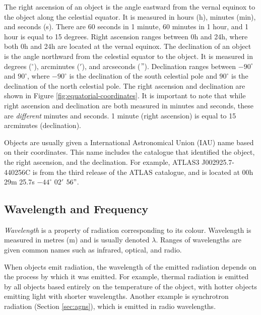             The right ascension of an object is the angle eastward from the
            vernal equinox to the object along the celestial equator. It is
            measured in hours (h), minutes (min), and seconds (s). There are 60
            seconds in 1 minute, 60 minutes in 1 hour, and 1 hour is equal to 15
            degrees. Right ascension ranges between 0h and 24h, where both 0h
            and 24h are located at the vernal equinox. The declination of an
            object is the angle northward from the celestial equator to the
            object. It is measured in degrees (${}^\circ$), arcminutes ($'$),
            and arcseconds ($"$). Declination ranges between $-90^\circ$ and
            $90^\circ$, where $-90^\circ$ is the declination of the south
            celestial pole and $90^\circ$ is the declination of the north
            celestial pole. The right ascension and declination are shown in
            Figure \ref{fig:equatorial-coordinates}. It is important to note
            that while right ascension and declination are both measured in
            minutes and seconds, these are \emph{different} minutes and seconds.
            1 minute (right ascension) is equal to 15 arcminutes (declination).

            Objects are usually given a International Astronomical Union (IAU)
            name based on their coordinates. This name includes the catalogue
            that identified the object, the right ascension, and the
            declination. For example, ATLAS3 J002925.7-440256C is from the third
            release of the ATLAS catalogue, and is located at 00h 29m 25.7s
            $-44^\circ$ $02'$ $56"$.

        \subsection{Wavelength and Frequency}
        \label{sec:wavelength}

            \emph{Wavelength} is a property of radiation corresponding to its
            colour. Wavelength is measured in metres (m) and is usually denoted $\lambda$. Ranges of wavelengths are given common names such as
            infrared, optical, and radio.

            When objects emit radiation, the wavelength of the emitted radiation
            depends on the process by which it was emitted. For example, thermal
            radiation is emitted by all objects based entirely on the
            temperature of the object, with hotter objects emitting light with
            shorter wavelengths. Another example is synchrotron radiation
            (Section \ref{sec:agns}), which is emitted in radio wavelengths.

